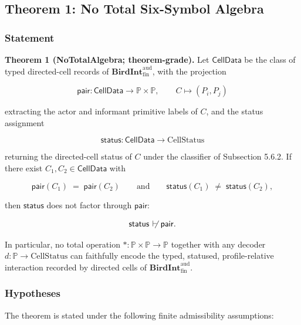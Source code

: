 \documentclass[11pt]{article}
\providecommand{\factor}{\mathrel{\!\vdash\!}}
\theoremstyle{definition}
\begin{document}
\subsection{Theorem 1: No Total Six-Symbol Algebra}

\subsubsection{Statement}

\textbf{Theorem 1 (NoTotalAlgebra; theorem-grade).} Let \(\mathsf{CellData}\) be the class of typed directed-cell records of \(\mathbf{BirdInt}^{\mathrm{aud}}_{\mathrm{fin}}\), with the projection

\[
\mathsf{pair}\colon\mathsf{CellData}\to\mathbb P\times\mathbb P,\qquad C\mapsto(P_i,P_j)
\]

extracting the actor and informant primitive labels of \(C\), and the status assignment

\[
\mathsf{status}\colon\mathsf{CellData}\to\mathrm{CellStatus}
\]

returning the directed-cell status of \(C\) under the classifier of Subsection 5.6.2. If there exist \(C_1,C_2\in\mathsf{CellData}\) with

\[
\mathsf{pair}(C_1)\;=\;\mathsf{pair}(C_2)\qquad\text{and}\qquad\mathsf{status}(C_1)\;\neq\;\mathsf{status}(C_2),
\]

then \(\mathsf{status}\) does not factor through \(\mathsf{pair}\):

\[
\mathsf{status}\;\not\factor\;\mathsf{pair}.
\]

In particular, no total operation \(*\colon\mathbb P\times\mathbb P\to\mathbb P\) together with any decoder \(d\colon\mathbb P\to\mathrm{CellStatus}\) can faithfully encode the typed, statused, profile-relative interaction recorded by directed cells of \(\mathbf{BirdInt}^{\mathrm{aud}}_{\mathrm{fin}}\).

\subsubsection{Hypotheses}

The theorem is stated under the following finite admissibility assumptions:
\end{document}
